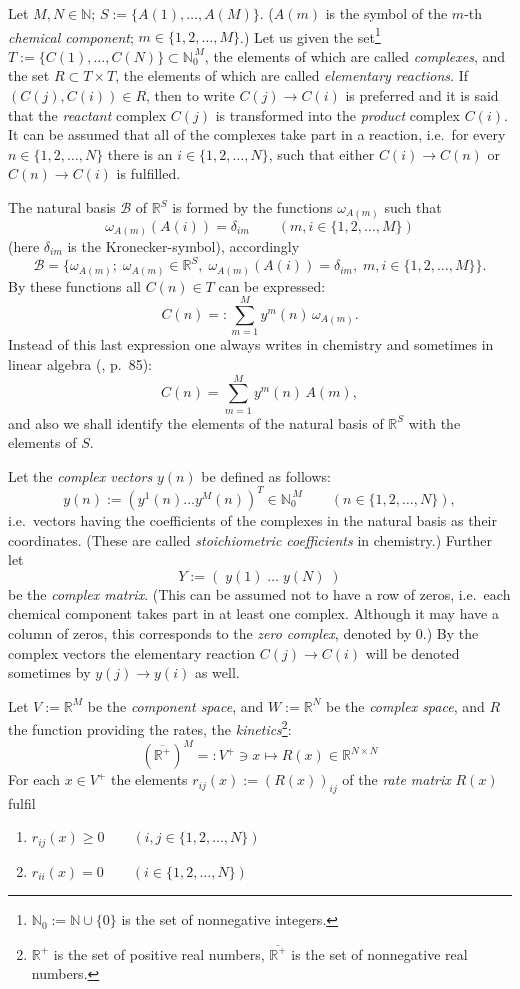 \documentclass[12pt,a4paper]{article}
\newcommand{\N}{\mathbb{N}}
\newcommand{\R}{\mathbb{R}}
\newcommand{\Nz}{\mathbb{N}_0}
\newcommand{\Rp}{\overline{\R^+}}
\begin{document}
Let $M, N \in \N$;\; $S :=\{A(1), \ldots, A(M)\}$.  ($A(m)$ is the symbol of the $m$-th \emph{chemical component};\; $m \in \{1,2,\ldots,M\}$.)  Let us given the set\footnote{$\Nz := \N \cup \{0\}$ is the set of nonnegative integers.} $T := \{C(1), \ldots, C(N)\} \subset \Nz^{\,M}$, the elements of which are called \emph{complexes}, and the set $R \subset T \times T$, the elements of which are called \emph{elementary reactions}.  If $(C(j), C(i)) \in R$, then to write $C(j) \to C(i)$ is preferred and it is said that the \emph{reactant} complex $C(j)$ is transformed into the \emph{product} complex $C(i)$.  It can be assumed that all of the complexes take part in a reaction, i.e.\ for every $n \in \{1,2,\ldots,N\}$ there is an $i \in \{1,2,\ldots,N\}$, such that either $C(i) \to C(n)$ or $C(n) \to C(i)$ is fulfilled.

The natural basis $\mathscr{B}$ of $\R^S$ is formed by the functions $\omega_{A(m)}$ such that
\[
  \omega_{A(m)}(A(i)) = \delta_{im} \qquad (m, i \in \{1,2,\ldots,M\})
\]
(here $\delta_{im}$ is the Kronecker-symbol), accordingly
\[
  \mathscr{B} = \{\omega_{A(m)} ;\; \omega_{A(m)} \in \R^S,\;
  \omega_{A(m)}(A(i)) = \delta_{im},\; m, i \in \{1,2,\ldots,M\}\}.
\]
By these functions all $C(n) \in T$ can be expressed:
\[
  C(n) =: \sum_{m=1}^{M} y^m(n)\, \omega_{A(m)}.
\]
Instead of this last expression one always writes in chemistry and sometimes in linear algebra (\cite{FeinbergHorn1977}, p.~85):
\[
  C(n) = \sum_{m=1}^{M} y^m(n)\, A(m),
\]
and also we shall identify the elements of the natural basis of $\R^S$ with the elements of $S$.

Let the \emph{complex vectors} $y(n)$ be defined as follows:
\[
  y(n) := (y^1(n) \ldots y^M(n))^T \in \Nz^{\,M}
  \qquad (n \in \{1,2,\ldots,N\}),
\]
i.e.\ vectors having the coefficients of the complexes in the natural basis as their coordinates.  (These are called \emph{stoichiometric coefficients} in chemistry.)  Further let
\[
  Y := (\; y(1) \;\ldots\; y(N)\;)
\]
be the \emph{complex matrix}.  (This can be assumed not to have a row of zeros, i.e.\ each chemical component takes part in at least one complex.  Although it may have a column of zeros, this corresponds to the \emph{zero complex}, denoted by $0$.)  By the complex vectors the elementary reaction $C(j) \to C(i)$ will be denoted sometimes by $y(j) \to y(i)$ as well.

Let $V := \R^M$ be the \emph{component space}, and $W := \R^N$ be the \emph{complex space}, and $R$ the function providing the rates, the \emph{kinetics}\footnote{$\R^+$ is the set of positive real numbers, $\Rp$ is the set of nonnegative real numbers.}:
\[
  (\Rp)^M =: V^+ \ni x \mapsto R(x) \in \R^{N \times N}
\]
For each $x \in V^+$ the elements $r_{ij}(x) := (R(x))_{ij}$ of the \emph{rate matrix} $R(x)$ fulfil
\begin{enumerate}
  \item[(i)] $r_{ij}(x) \ge 0 \qquad (i,j \in \{1,2,\ldots,N\})$
  \item[(ii)] $r_{ii}(x) = 0 \qquad (i \in \{1,2,\ldots,N\})$
\end{enumerate}
\end{document}
